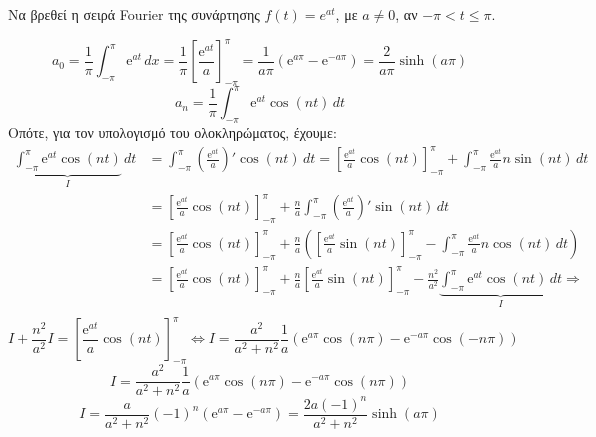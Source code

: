 \documentclass[a4paper,table]{report}
\begin{document}
\begin{mybox3}
  \begin{example}
    Να βρεθεί η σειρά \textlatin{Fourier} της συνάρτησης $ f(t) = e^{at} $, με $ a \neq 0 $, αν 
    $ - \pi < t \leq \pi $.
  \end{example}
\end{mybox3}
\begin{solution}
  \[
    a_{0} = \frac{1}{\pi} \int _{- \pi }^{\pi} \mathrm{e}^{at} \,{dx} = 
    \frac{1}{\pi} \left[\frac{\mathrm{e}^{at}}{a} \right] _{- \pi }^{\pi} = 
    \frac{1}{a\pi} (\mathrm{e}^{a \pi} - \mathrm{e}^{-a \pi}) = \frac{2}{a \pi} 
    \sinh{(a \pi)} 
  \]
  \[
    a_{n} = \frac{1}{\pi} \int_{-\pi}^{\pi} \mathrm{e}^{at} \cos{(nt)} \,{dt}
  \]
  Οπότε, για τον υπολογισμό του ολοκληρώματος, έχουμε:
  \begin{align*}
    \underbrace{\int_{-\pi}^{\pi} \mathrm{e}^{at} \cos{(nt)}}_{I} \,{dt} 
    &= \int_{-\pi}^{\pi} \left(\frac{\mathrm{e}^{at}}{a} \right)' \cos{(nt)}\,{dt} 
    = \left[\frac{\mathrm{e}^{at}}{a} \cos{(nt)} 
    \right]_{- \pi }^{\pi} + \int_{-\pi}^{\pi} \frac{\mathrm{e}^{at}}{a} n \sin{(nt)}
    \,{dt} \\
    &= \left[\frac{\mathrm{e}^{at}}{a} \cos{(nt)} 
    \right]_{- \pi }^{\pi} + \frac{n}{a}  \int_{-\pi}^{\pi}
    \left(\frac{\mathrm{e}^{at}}{a}\right)' \sin{(nt)} \,{dt} \\
    &= \left[\frac{\mathrm{e}^{at}}{a} \cos{(nt)} 
    \right]_{- \pi }^{\pi} + \frac{n}{a} 
    \left(\left[\frac{\mathrm{e}^{at}}{a} \sin{(nt)} 
      \right]_{- \pi }^{\pi }-\int_{-\pi}^{\pi} \frac{\mathrm{e}^{at}}{a} n 
    \cos{(nt)} \,{dt}\right) \\ 
    &= \left[\frac{\mathrm{e}^{at}}{a} \cos{(nt)} 
    \right]_{- \pi }^{\pi} + \frac{n}{a} 
    \left[\frac{\mathrm{e}^{at}}{a} \sin{(nt)} 
    \right]_{- \pi }^{\pi }- \frac{n^{2}}{a^{2}}
    \underbrace{\int_{-\pi}^{\pi}
    \mathrm{e}^{at} \cos{(nt)} \,{dt}}_{I} \Rightarrow \\ 
  \end{align*}
  \[
    I+ \frac{n^{2}}{a^{2}} I =  \left[\frac{\mathrm{e}^{at}}{a} \cos{(nt)} 
    \right]_{- \pi }^{\pi} \Leftrightarrow 
    I = \frac{a^{2}}{a^{2}+n^{2}} \frac{1}{a}
    \left(\mathrm{e}^{a \pi} \cos{(n \pi)} - \mathrm{e}^{-a \pi} \cos{(-n \pi)}\right)
  \]
  \[
    I = \frac{a^{2}}{a^{2}+n^{2}} \frac{1}{a}
    \left(\mathrm{e}^{a \pi} \cos{(n \pi)} - \mathrm{e}^{-a \pi} \cos{(n \pi)}\right)
  \] 
  \[
    I = \frac{a}{a^{2}+n^{2}} (-1)^{n} \left(\mathrm{e}^{a \pi} - 
    \mathrm{e}^{-a \pi}\right) = \frac{2a(-1)^{n}}{a^{2}+n^{2}} \sinh{(a \pi)} 
\]
\end{solution}
\end{document}
